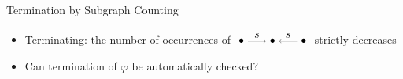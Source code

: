 \documentclass{beamer}
\newcommand{\graphbox}[8]{
  \begin{scope}[xshift=#2,yshift=#3]
    \draw [rounded corners=2mm] (0,0) rectangle (#4,-#5);
    \node at (0,0mm) [anchor=north west,inner sep=1mm] {#1};
    \begin{scope}[xshift=#4/2+#6,yshift=#7] 
    #8
    \end{scope}
  \end{scope}
}
\newcommand{\opn}[1]{\operatorname{#1}}
\begin{document}
\begin{frame}{Termination by Subgraph Counting}
\begin{itemize}
{
            }
        \item  Terminating: the number of occurrences of $\tikz[baseline=-0.5ex]{ 
                \node (x) at (0,0) {$\bullet$}; 
                \node (y) at (1,0) {$\bullet$};
                \node (z) at (2,0) {$\bullet$};
                \draw[->] (x) -- (y) node[midway, above] {$s$};
                \draw[->] (z) -- (y) node[midway, above] {$s$};
        }$ strictly decreases
        \item Can termination of $\varphi$ be automatically checked?
    \end{itemize}
    

   

    
\end{frame}



\end{document}
